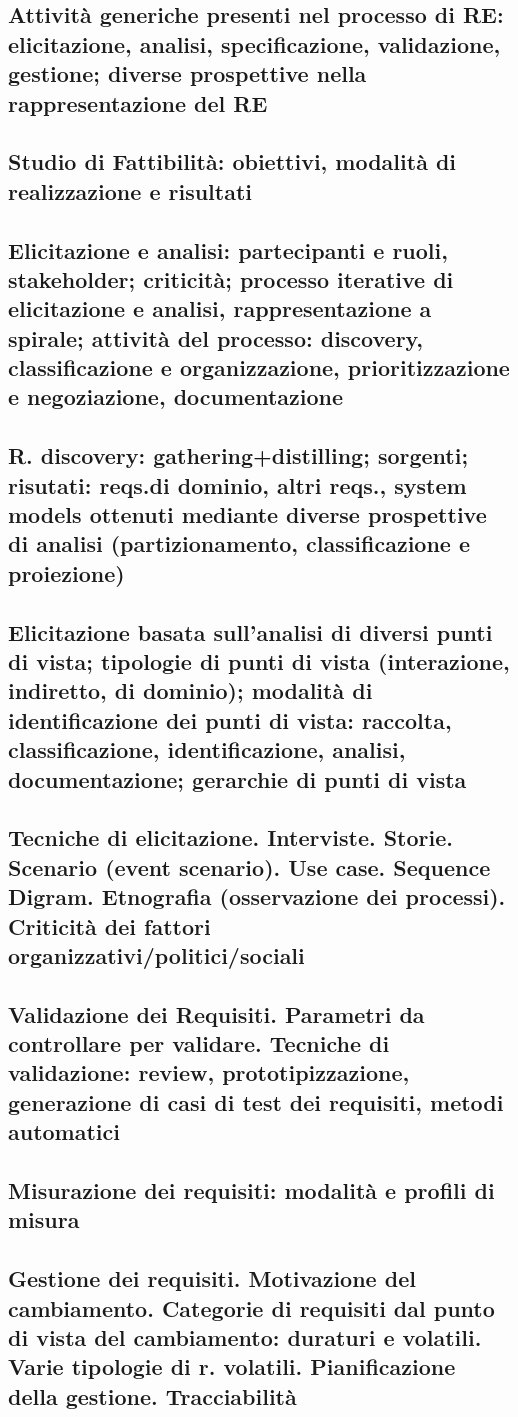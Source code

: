 \subsection{Attività generiche presenti nel processo di RE: elicitazione, analisi, specificazione, validazione, gestione; diverse prospettive nella rappresentazione del RE}
\subsection{Studio di Fattibilità: obiettivi, modalità di realizzazione e risultati}
\subsection{Elicitazione e analisi: partecipanti e ruoli, stakeholder; criticità; processo iterative di elicitazione e analisi, rappresentazione a spirale; attività del processo: discovery, classificazione e organizzazione, prioritizzazione e negoziazione, documentazione}
\subsection{R. discovery: gathering+distilling; sorgenti; risutati: reqs.di dominio, altri reqs., system models ottenuti mediante diverse prospettive di analisi (partizionamento, classificazione e proiezione)}
\subsection{Elicitazione basata sull’analisi di diversi punti di vista; tipologie di punti di vista (interazione, indiretto, di dominio); modalità di identificazione dei punti di vista: raccolta, classificazione, identificazione, analisi, documentazione; gerarchie di punti di vista}
\subsection{Tecniche di elicitazione. Interviste. Storie. Scenario (event scenario). Use case. Sequence Digram. Etnografia (osservazione dei processi). Criticità dei fattori organizzativi/politici/sociali}
\subsection{Validazione dei Requisiti. Parametri da controllare per validare. Tecniche di validazione: review, prototipizzazione, generazione di casi di test dei requisiti, metodi automatici}
\subsection{Misurazione dei requisiti: modalità e profili di misura}
\subsection{Gestione dei requisiti. Motivazione del cambiamento. Categorie di requisiti dal punto di vista del cambiamento: duraturi e volatili. Varie tipologie di r. volatili. Pianificazione della gestione. Tracciabilità}